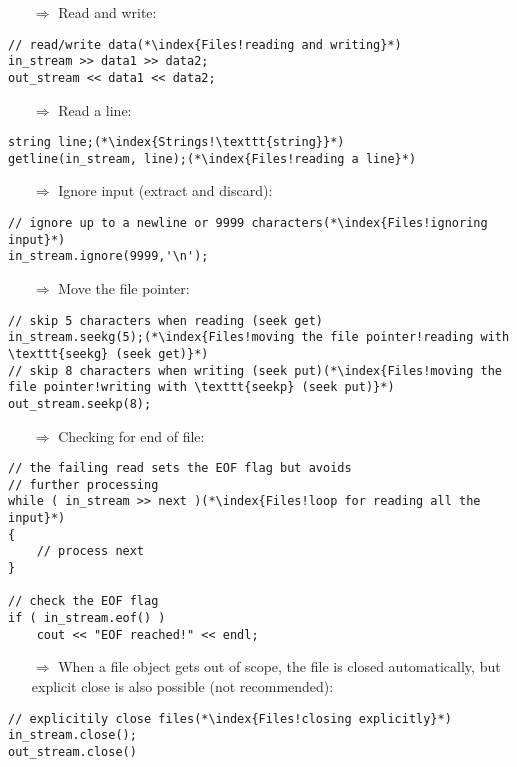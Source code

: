 \documentclass[10pt]{book}
\begin{document}
\begin{enumerate}
\item[$\Rightarrow$] Read and write:
\end{enumerate}
\begin{lstlisting}
// read/write data(*\index{Files!reading and writing}*)
in_stream >> data1 >> data2;
out_stream << data1 << data2;
\end{lstlisting}
\begin{enumerate}
\item[$\Rightarrow$] Read a line:
\end{enumerate}
\begin{lstlisting}
string line;(*\index{Strings!\texttt{string}}*)
getline(in_stream, line);(*\index{Files!reading a line}*)
\end{lstlisting}
\begin{enumerate}
\item[$\Rightarrow$] Ignore input (extract and discard):
\end{enumerate}
\begin{lstlisting}
// ignore up to a newline or 9999 characters(*\index{Files!ignoring input}*)
in_stream.ignore(9999,'\n');
\end{lstlisting}
\begin{enumerate}
\item[$\Rightarrow$] Move the file pointer:
\end{enumerate}
\begin{lstlisting}
// skip 5 characters when reading (seek get)
in_stream.seekg(5);(*\index{Files!moving the file pointer!reading with \texttt{seekg} (seek get)}*)
// skip 8 characters when writing (seek put)(*\index{Files!moving the file pointer!writing with \texttt{seekp} (seek put)}*)
out_stream.seekp(8);
\end{lstlisting}
\begin{enumerate}
\item[$\Rightarrow$] Checking for end of file:
\end{enumerate}
\begin{lstlisting}
// the failing read sets the EOF flag but avoids
// further processing
while ( in_stream >> next )(*\index{Files!loop for reading all the input}*)
{
    // process next
}

// check the EOF flag
if ( in_stream.eof() )
    cout << "EOF reached!" << endl;
\end{lstlisting}
\begin{enumerate}
\item[$\Rightarrow$] When a file object gets out of scope, the file is closed automatically, but explicit
close is also possible (not recommended):
\end{enumerate}
\begin{lstlisting}
// explicitily close files(*\index{Files!closing explicitly}*)
in_stream.close();
out_stream.close()
\end{lstlisting}
%
%
\end{document}
